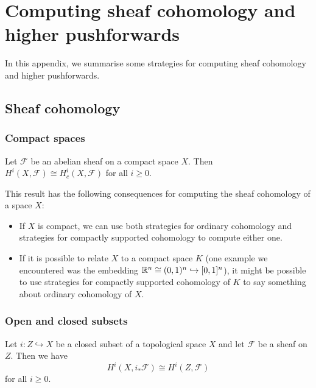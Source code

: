 \RenewDocumentCommand{}
\chapter{Computing sheaf cohomology and higher pushforwards}

In this appendix, we summarise some strategies for computing sheaf cohomology and higher pushforwards.

\section{Sheaf cohomology}

\subsection{Compact spaces}
\begin{lem}[name={\cref{lem:compactly-supported-cohomology-is-ordinary-cohomology-on-compact-space}}]
Let \(\mathcal F\) be an abelian sheaf on a compact space \(X\).
Then \(H^i(X,\mathcal F)\cong H^i_c(X,\mathcal F)\) for all \(i\geq 0\).
\end{lem}

This result has the following consequences for computing the sheaf cohomology of a space \(X\):
\begin{itemize}
\item If \(X\) is compact, we can use both strategies for ordinary cohomology and strategies for compactly supported cohomology to compute either one.
\item If it is possible to relate \(X\) to a compact space \(K\) (one example we encountered was the embedding \(\mathbb{R}^n\cong(0,1)^n\hookrightarrow [0,1]^n\)), it might be possible to use strategies for compactly supported cohomology of \(K\) to say something about ordinary cohomology of \(X\).
\end{itemize}

\subsection{Open and closed subsets}
\begin{lem}
Let \(i\colon Z\hookrightarrow X\) be a closed subset of a topological space \(X\) and let \(\mathcal F\) be a sheaf on \(Z\).
Then we have
\[ H^i(X,i_*\mathcal F) \cong H^i(Z,\mathcal F) \]
for all \(i\geq 0\).
\end{lem}

